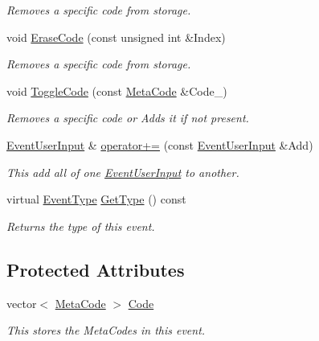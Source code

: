\begin{DoxyCompactItemize}
\begin{DoxyCompactList}\small\item\em Removes a specific code from storage. \item\end{DoxyCompactList}\item 
void \hyperlink{classphys_1_1EventUserInput_a583084578443019d6e286b8f0e02ce58}{EraseCode} (const unsigned int \&Index)
\begin{DoxyCompactList}\small\item\em Removes a specific code from storage. \item\end{DoxyCompactList}\item 
void \hyperlink{classphys_1_1EventUserInput_adf603505c43162cf9331a486d5832f75}{ToggleCode} (const \hyperlink{classphys_1_1MetaCode}{MetaCode} \&Code\_\-)
\begin{DoxyCompactList}\small\item\em Removes a specific code or Adds it if not present. \item\end{DoxyCompactList}\item 
\hyperlink{classphys_1_1EventUserInput}{EventUserInput} \& \hyperlink{classphys_1_1EventUserInput_a1d6895e1b3814c1a63f5605b88ba85e5}{operator+=} (const \hyperlink{classphys_1_1EventUserInput}{EventUserInput} \&Add)
\begin{DoxyCompactList}\small\item\em This add all of one \hyperlink{classphys_1_1EventUserInput}{EventUserInput} to another. \item\end{DoxyCompactList}\item 
virtual \hyperlink{classphys_1_1EventBase_a5e6a8564e127f654123f0bf6a2751923}{EventType} \hyperlink{classphys_1_1EventUserInput_a3e803a8d9bcc1576fe04d2245a86ec80}{GetType} () const 
\begin{DoxyCompactList}\small\item\em Returns the type of this event. \item\end{DoxyCompactList}\end{DoxyCompactItemize}
\subsection*{Protected Attributes}
\begin{DoxyCompactItemize}
\item 
vector$<$ \hyperlink{classphys_1_1MetaCode}{MetaCode} $>$ \hyperlink{classphys_1_1EventUserInput_aee3dc1d8cac82482651487c48c6c60c9}{Code}
\begin{DoxyCompactList}\small\item\em This stores the MetaCodes in this event. \item\end{DoxyCompactList}\end{DoxyCompactItemize}


